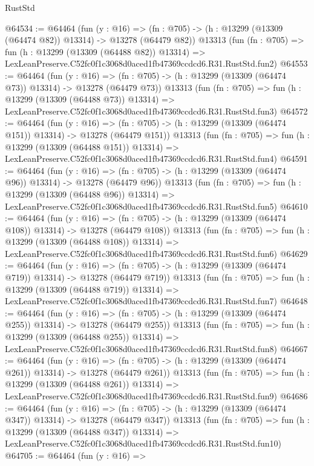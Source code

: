 \begin{lexlean}{RustStd}
\begin{coremodule}
@64534 := @64464
    (fun (y : @16) =>
    (fn : @705) -> (h : @13299 (@13309 (@64474 @82)) @13314) -> @13278 (@64479 @82))
    @13313
    (fun (fn : @705) =>
    fun (h : @13299 (@13309 (@64488 @82)) @13314) =>
    LexLeanPreserve.C52fc0f1c3068d0aced1fb47369ccdcd6.R31.RustStd.fun2)
@64553 := @64464
    (fun (y : @16) =>
    (fn : @705) -> (h : @13299 (@13309 (@64474 @73)) @13314) -> @13278 (@64479 @73))
    @13313
    (fun (fn : @705) =>
    fun (h : @13299 (@13309 (@64488 @73)) @13314) =>
    LexLeanPreserve.C52fc0f1c3068d0aced1fb47369ccdcd6.R31.RustStd.fun3)
@64572 := @64464
    (fun (y : @16) =>
    (fn : @705) -> (h : @13299 (@13309 (@64474 @151)) @13314) -> @13278 (@64479 @151))
    @13313
    (fun (fn : @705) =>
    fun (h : @13299 (@13309 (@64488 @151)) @13314) =>
    LexLeanPreserve.C52fc0f1c3068d0aced1fb47369ccdcd6.R31.RustStd.fun4)
@64591 := @64464
    (fun (y : @16) =>
    (fn : @705) -> (h : @13299 (@13309 (@64474 @96)) @13314) -> @13278 (@64479 @96))
    @13313
    (fun (fn : @705) =>
    fun (h : @13299 (@13309 (@64488 @96)) @13314) =>
    LexLeanPreserve.C52fc0f1c3068d0aced1fb47369ccdcd6.R31.RustStd.fun5)
@64610 := @64464
    (fun (y : @16) =>
    (fn : @705) -> (h : @13299 (@13309 (@64474 @108)) @13314) -> @13278 (@64479 @108))
    @13313
    (fun (fn : @705) =>
    fun (h : @13299 (@13309 (@64488 @108)) @13314) =>
    LexLeanPreserve.C52fc0f1c3068d0aced1fb47369ccdcd6.R31.RustStd.fun6)
@64629 := @64464
    (fun (y : @16) =>
    (fn : @705) -> (h : @13299 (@13309 (@64474 @719)) @13314) -> @13278 (@64479 @719))
    @13313
    (fun (fn : @705) =>
    fun (h : @13299 (@13309 (@64488 @719)) @13314) =>
    LexLeanPreserve.C52fc0f1c3068d0aced1fb47369ccdcd6.R31.RustStd.fun7)
@64648 := @64464
    (fun (y : @16) =>
    (fn : @705) -> (h : @13299 (@13309 (@64474 @255)) @13314) -> @13278 (@64479 @255))
    @13313
    (fun (fn : @705) =>
    fun (h : @13299 (@13309 (@64488 @255)) @13314) =>
    LexLeanPreserve.C52fc0f1c3068d0aced1fb47369ccdcd6.R31.RustStd.fun8)
@64667 := @64464
    (fun (y : @16) =>
    (fn : @705) -> (h : @13299 (@13309 (@64474 @261)) @13314) -> @13278 (@64479 @261))
    @13313
    (fun (fn : @705) =>
    fun (h : @13299 (@13309 (@64488 @261)) @13314) =>
    LexLeanPreserve.C52fc0f1c3068d0aced1fb47369ccdcd6.R31.RustStd.fun9)
@64686 := @64464
    (fun (y : @16) =>
    (fn : @705) -> (h : @13299 (@13309 (@64474 @347)) @13314) -> @13278 (@64479 @347))
    @13313
    (fun (fn : @705) =>
    fun (h : @13299 (@13309 (@64488 @347)) @13314) =>
    LexLeanPreserve.C52fc0f1c3068d0aced1fb47369ccdcd6.R31.RustStd.fun10)
@64705 := @64464
    (fun (y : @16) =>

\end{coremodule}
\end{lexlean}
